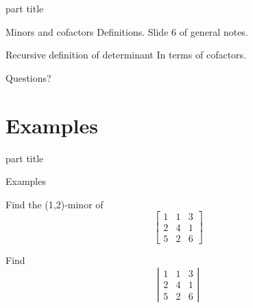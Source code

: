 \documentclass{beamer}
\begin{document}
\begin{frame}
  \begin{beamercolorbox}[sep=12pt,center]{part title}
    \insertsection\par
  \end{beamercolorbox}
\end{frame}

\begin{frame}{Minors and cofactors}
  Definitions. Slide 6 of general notes.
\end{frame}

\begin{frame}{Recursive definition of determinant}
  In terms of cofactors.
\end{frame}


\begin{frame}
  Questions?
\end{frame}

\section{Examples}

\begin{frame}
  \begin{beamercolorbox}[sep=12pt,center]{part title}
    \insertsection\par
  \end{beamercolorbox}
\end{frame}

\begin{frame}{Examples}
  \begin{example}
    Find the (1,2)-minor of
    \begin{equation*}
      \left[
	\begin{array}{ccc}
          1&1&3\\
          2&4&1\\
          5&2&6
	\end{array}
      \right]
    \end{equation*}
  \end{example}
  \begin{example}
    Find
    \begin{equation*}
      \left|
	\begin{array}{ccc}
          1&1&3\\
          2&4&1\\
          5&2&6
	\end{array}
      \right|
    \end{equation*}
  \end{example}
\end{frame}
\end{document}
